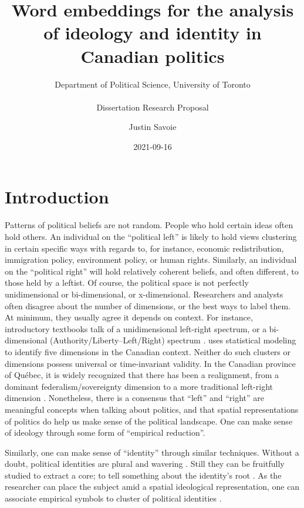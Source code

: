 \documentclass[
  openany]{book}
\title{Word embeddings for the analysis of ideology and identity in Canadian politics}
\subtitle{\hfill\break
Department of Political Science, University of Toronto\\
~\\
Dissertation Research Proposal}
\author{Justin Savoie}
\date{2021-09-16}
\begin{document}
\maketitle

{
\setcounter{tocdepth}{1}
\tableofcontents
}
\hypertarget{intro}{%
\chapter{Introduction}\label{intro}}

Patterns of political beliefs are not random. People who hold certain ideas often hold others. An individual on the ``political left'' is likely to hold views clustering in certain specific ways with regards to, for instance, economic redistribution, immigration policy, environment policy, or human rights. Similarly, an individual on the ``political right'' will hold relatively coherent beliefs, and often different, to those held by a leftist. Of course, the political space is not perfectly unidimensional or bi-dimensional, or x-dimensional. Researchers and analysts often disagree about the number of dimensions, or the best ways to label them. At minimum, they usually agree it depends on context. For instance, introductory textbooks talk of a unidimensional left-right spectrum, or a bi-dimensional (Authority/Liberty--Left/Right) spectrum \citep{heywood2017political}. \citet{heroux2016substate} uses statistical modeling to identify five dimensions in the Canadian context. Neither do such clusters or dimensions possess universal or time-invariant validity. In the Canadian province of Québec, it is widely recognized that there has been a realignment, from a dominant federalism/sovereignty dimension to a more traditional left-right dimension \citep{montigny2016fin}. Nonetheless, there is a consensus that ``left'' and ``right'' are meaningful concepts when talking about politics, and that spatial representations of politics do help us make sense of the political landscape. One can make sense of ideology through some form of ``empirical reduction''.

Similarly, one can make sense of ``identity'' through similar techniques. Without a doubt, political identities are plural and wavering \citep[\citet{ozkirimli2017theories}]{hobsbawm2012invention}. Still they can be fruitfully studied to extract a core; to tell something about the identity's root \citep{schwartz1967public}. As the researcher can place the subject amid a spatial ideological representation, one can associate empirical symbols to cluster of political identities \citep{dufresne2019symbolic}.
\end{document}
